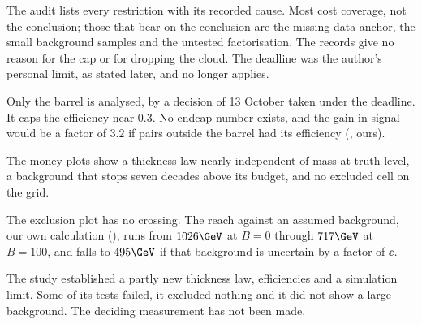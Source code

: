 \begin{chaptersummary}
  \item The audit lists every restriction with its recorded cause. Most cost coverage, not the conclusion; those that bear on the conclusion are the missing data anchor, the small background samples and the untested factorisation. The records give no reason for the cap or for dropping the cloud. The deadline was the author's personal limit, as stated later, and no longer applies.
  \item Only the barrel is analysed, by a decision of 13 October taken under the deadline. It caps the efficiency near $0.3$. No endcap number exists, and the gain in signal would be a factor of $3.2$ if pairs outside the barrel had its efficiency (\EST, ours).
  \item The money plots show a thickness law nearly independent of mass at truth level, a background that stops seven decades above its budget, and no excluded cell on the grid.
  \item The exclusion plot has no crossing. The reach against an assumed background, our own calculation (\EST), runs from $1026\GeV$ at $B=0$ through $717\GeV$ at $B=100$, and falls to $495\GeV$ if that background is uncertain by a factor of $\ee$.
  \item The study established a partly new thickness law, efficiencies and a simulation limit. Some of its tests failed, it excluded nothing and it did not show a large background. The deciding measurement has not been made.
\end{chaptersummary}

